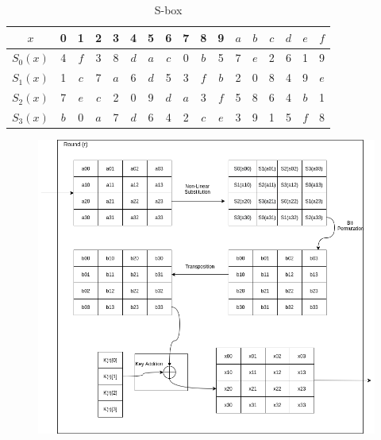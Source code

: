 \documentclass{transcrypto}
\begin{document}
	\begin{table}[H]
		\centering
		\begin{tabular}{|c|c|c|c|c|c|c|c|c|c|c|c|c|c|c|c|c|}
			\hline
			$x$ & 0 & 1 & 2 & 3 & 4 & 5 & 6 & 7 & 8 & 9 & $ a $ & $ b $ & $ c $ & $ d $ & $ e $ & $ f $ \\ \hline \hline
			$S_{0}(x)$ & 4 & $f$ & 3 & 8  & $d$ & $a$ & $ c $ & 0 & $b$ & 5 & $ 7 $ & $ e $ &  2  &  6  & 1 & 9 \\ \hline
			$S_{1}(x)$ & 1 & $c$ & 7 & $a$ & 6 & $d$ & 5 & 3 &$f$ & $b$ & 2 & 0 & 8 & 4 &  9 & $e$ \\ \hline
			$S_{2}(x)$ & 7 & $e$ & $c$ & 2 & 0 & 9 & $d$ & $a$ & 3 & $f$ & 5 & 8 & 6 & 4 & $b$ & 1 \\ \hline
			$S_{3}(x)$ & $b$ & 0 & $a$ & 7 & $d$ & 6 & 4 & 2 & $c$ & $e$ & 3 & 9 & 1 & 5 & $f$ & 8 \\ \hline
		\end{tabular}
		\caption{S-box}
	\end{table}
\begin{figure}[H]
	\includegraphics[width=1\linewidth]{Round.png}
\end{figure}
\end{document}
